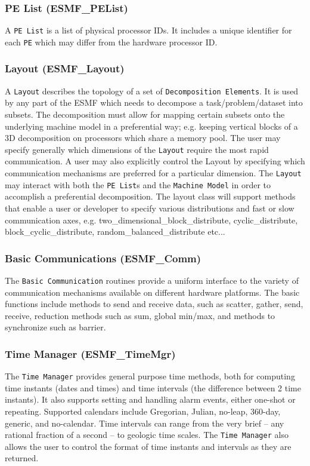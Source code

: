 \subsubsection{PE List (ESMF\_PEList)}
\label{sec:pelist} 
A {\tt PE List} is a list of physical processor IDs.  It includes a 
unique identifier for each {\tt PE} which may differ from the hardware 
processor ID.  

\subsubsection{Layout (ESMF\_Layout)}
\label{sec:layout} 
A {\tt Layout} describes the topology of a set of {\tt Decomposition 
Elements}.
It is used by any part of the ESMF which needs
to decompose a task/problem/dataset into subsets.
The decomposition must allow for mapping certain subsets onto the
underlying machine model in a preferential way; e.g. keeping
vertical blocks of a 3D decomposition on processors which share
a memory pool.  The user may specify generally which 
dimensions of the {\tt Layout} require the most rapid communication.
A user may also explicitly control the {Layout} by specifying which 
communication mechanisms are preferred for a particular dimension.
The {\tt Layout} may interact with both the {\tt PE List}s
and the {\tt Machine Model} in order to accomplish a preferential
decomposition. The layout class will support methods that enable a user or
developer to specify various distributions and fast or slow 
communication axes, e.g. two\_dimensional\_block\_distribute,
cyclic\_distribute, block\_cyclic\_distribute, random\_balanced\_distribute 
etc...


\subsubsection{Basic Communications (ESMF\_Comm)}
\label{sec:basiccomm} 
The {\tt Basic Communication} routines provide a uniform 
interface to the variety of communication mechanisms available
on different hardware platforms.  
The basic functions include methods to send
and receive data, such as scatter, gather, send, receive,
reduction methods such as sum, global min/max, and methods
to synchronize such as barrier. 

\subsubsection{Time Manager (ESMF\_TimeMgr)}
\label{sec:timemgr} 
The {\tt Time Manager} provides general purpose time methods, both
for computing time instants (dates and times) and time intervals
(the difference between 2 time instants).   It also supports 
setting and handling alarm events, either one-shot or repeating.
Supported calendars include Gregorian, Julian, no-leap, 360-day, 
generic, and no-calendar.
Time intervals can range from the very brief -- any rational fraction
of a second -- to geologic time scales.
The {\tt Time Manager} also allows the user to control the format of
time instants and intervals as they are returned.


